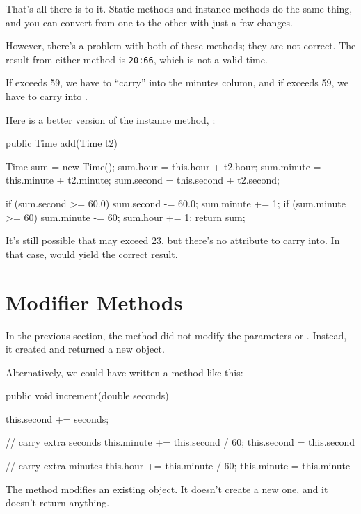 That's all there is to it.
Static methods and instance methods do the same thing, and you can convert from one to the other with just a few changes.

However, there's a problem with both of these methods; they are not correct.
The result from either method is {\tt 20:66}, which is not a valid time.

If  exceeds 59, we have to ``carry'' into the minutes column, and if  exceeds 59, we have to carry into .

Here is a better version of the instance method, :

\begin{code}
public Time add(Time t2) {
    Time sum = new Time();
    sum.hour = this.hour + t2.hour;
    sum.minute = this.minute + t2.minute;
    sum.second = this.second + t2.second;
    
    if (sum.second >= 60.0) {
        sum.second -= 60.0;
        sum.minute += 1;
    }
    if (sum.minute >= 60) {
        sum.minute -= 60;
        sum.hour += 1;
    }
    return sum;
}
\end{code}

It's still possible that  may exceed 23, but there's no  attribute to carry into.
In that case,  would yield the correct result.


\section{Modifier Methods}

In the previous section, the  method did not modify the parameters  or .
Instead, it created and returned a new  object.

Alternatively, we could have written a method like this:

\begin{code}
public void increment(double seconds) {
    this.second += seconds;

    // carry extra seconds
    this.minute += this.second / 60;
    this.second = this.second %

    // carry extra minutes
    this.hour += this.minute / 60;
    this.minute = this.minute %
}
\end{code}

The  method modifies an existing  object.
It doesn't create a new one, and it doesn't return anything.

